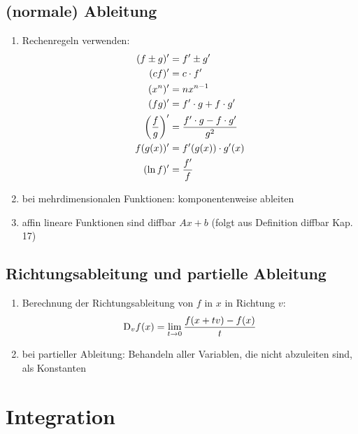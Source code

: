 \documentclass[ngerman,a4paper]{article}
\begin{document}
\subsection{(normale) Ableitung}
\begin{enumerate}[label=\textbf{\arabic*.}]
	\item Rechenregeln verwenden:
	\begin{align}
		(f\pm g)' &= f'\pm g'\notag \\
		(cf)' &= c\cdot f'\notag \\
		(x^n)' &= nx^{n-1}\notag \\
		(fg)' &= f'\cdot g + f\cdot g' \notag \\
		\left(\frac{f}{g}\right)' &= \frac{f'\cdot g-f\cdot g'}{g^2}\notag \\
		f(g(x))' &= f'(g(x))\cdot g'(x)\notag \\
		(\ln f)' &= \frac{f'}{f}\notag
	\end{align}
	\item bei mehrdimensionalen Funktionen: komponentenweise ableiten
	\item affin lineare Funktionen sind diffbar $Ax+b$ (folgt aus Definition diffbar Kap. 17)
\end{enumerate}

\subsection{Richtungsableitung und partielle Ableitung}
\begin{enumerate}[label=\textbf{\arabic*.}]
	\item Berechnung der Richtungsableitung von $f$ in $x$ in Richtung $v$:
	\begin{align}
		\mathrm{D}_vf(x)=\lim\limits_{t\to 0}\frac{f(x+tv)-f(x)}{t}\notag
	\end{align}
	\item bei partieller Ableitung: Behandeln aller Variablen, die nicht abzuleiten sind, als Konstanten
\end{enumerate}

\section{Integration}
\end{document}
